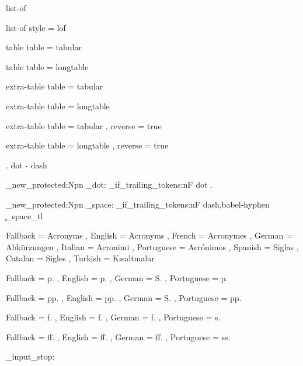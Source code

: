  {list-of}
  { }

 {list-of}
  { style = lof }

 {table}
  { table = tabular }

 {table}
  { table = longtable }

 {extra-table}
  { table = tabular }

 {extra-table}
  { table = longtable }

 {extra-table}
  {
    table   = tabular ,
    reverse = true
  }

 {extra-table}
  {
    table   = longtable ,
    reverse = true
  }

\AcroRegisterTrailing . {dot}
\AcroRegisterTrailing - {dash}
\AcroRegisterTrailing {}


\cs_new_protected:Npn \acro_dot:
  { \acro_if_trailing_tokens:nF {dot} {.\@} }

\cs_new_protected:Npn \acro_space:
  { \acro_if_trailing_tokens:nF {dash,babel-hyphen} { \c_space_tl } }

  {
    Fallback   = Acronyms ,
    English    = Acronyms ,
    French     = Acronymes ,
    German     = Abk\"urzungen ,
    Italian    = Acronimi ,
    Portuguese = Acr\'onimos ,
    Spanish    = Siglas ,
    Catalan    = Sigles ,
    Turkish    = K\i saltmalar
  }

  {
    Fallback   = p. ,
    English    = p. ,
    German     = S. ,
    Portuguese = p.
  }

  {
    Fallback   = pp. ,
    English    = pp. ,
    German     = S. ,
    Portuguese = pp.
  }

  {
    Fallback   = f. ,
    English    = f. ,
    German     = f. ,
    Portuguese = s.
  }

  {
    Fallback   = ff. ,
    English    = ff. ,
    German     = ff. ,
    Portuguese = ss.
  }

\file_input_stop:
